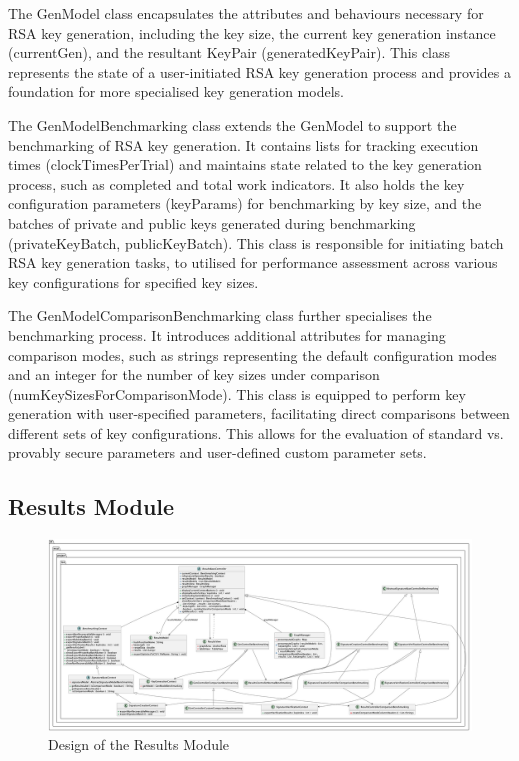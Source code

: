 \documentclass[]{final_report}
\theoremstyle{definition}
\begin{document}
The GenModel class encapsulates the attributes and behaviours necessary for RSA key generation, including the key size, the current key generation instance (currentGen), and the resultant KeyPair (generatedKeyPair). This class represents the state of a user-initiated RSA key generation process and provides a foundation for more specialised key generation models.

The GenModelBenchmarking class extends the GenModel to support the benchmarking of RSA key generation. It contains lists for tracking execution times (clockTimesPerTrial) and maintains state related to the key generation process, such as completed and total work indicators. It also holds the key configuration parameters (keyParams) for benchmarking by key size, and the batches of private and public keys generated during benchmarking (privateKeyBatch, publicKeyBatch). This class is responsible for initiating batch RSA key generation tasks, to utilised for performance assessment across various key configurations for specified key sizes.

The GenModelComparisonBenchmarking class further specialises the benchmarking process. It introduces additional attributes for managing comparison modes, such as strings representing the default configuration modes and an integer for the number of key sizes under comparison (numKeySizesForComparisonMode). This class is equipped to perform key generation with user-specified parameters, facilitating direct comparisons between different sets of key configurations. This allows for the evaluation of standard vs. provably secure parameters and user-defined custom parameter sets.



\begin{landscape}
\subsection{Results Module}
\pagestyle{empty}%
\begin{figure}[h]
    \centering
    \includegraphics[scale = 0.263]{main_pictures/results.png}
    \caption{Design of the Results Module}
    \label{fig:RESULTSMODULEDESIGN}
\end{figure}
\end{landscape}
\end{document}
